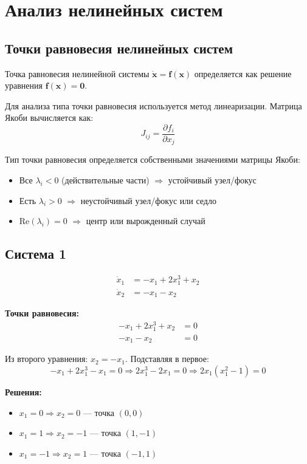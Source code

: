 \section*{Анализ нелинейных систем}

\subsection*{Точки равновесия нелинейных систем}

Точка равновесия нелинейной системы $\dot{\mathbf{x}} = \mathbf{f}(\mathbf{x})$ определяется как решение уравнения $\mathbf{f}(\mathbf{x}) = \mathbf{0}$.

Для анализа типа точки равновесия используется метод линеаризации. Матрица Якоби вычисляется как:
$$J_{ij} = \frac{\partial f_i}{\partial x_j}$$

Тип точки равновесия определяется собственными значениями матрицы Якоби:
\begin{itemize}
\item Все $\lambda_i < 0$ (действительные части) $\Rightarrow$ устойчивый узел/фокус
\item Есть $\lambda_i > 0$ $\Rightarrow$ неустойчивый узел/фокус или седло
\item $\text{Re}(\lambda_i) = 0$ $\Rightarrow$ центр или вырожденный случай
\end{itemize}

\subsection*{Система 1}

\begin{align}
\dot{x}_1 &= -x_1 + 2x_1^3 + x_2 \\
\dot{x}_2 &= -x_1 - x_2
\end{align}

\textbf{Точки равновесия:}
\begin{align}
-x_1 + 2x_1^3 + x_2 &= 0 \\
-x_1 - x_2 &= 0
\end{align}

Из второго уравнения: $x_2 = -x_1$. Подставляя в первое:
$$-x_1 + 2x_1^3 - x_1 = 0 \Rightarrow 2x_1^3 - 2x_1 = 0 \Rightarrow 2x_1(x_1^2 - 1) = 0$$

\textbf{Решения:}
\begin{itemize}
\item $x_1 = 0 \Rightarrow x_2 = 0$ --- точка $(0, 0)$
\item $x_1 = 1 \Rightarrow x_2 = -1$ --- точка $(1, -1)$
\item $x_1 = -1 \Rightarrow x_2 = 1$ --- точка $(-1, 1)$
\end{itemize}

